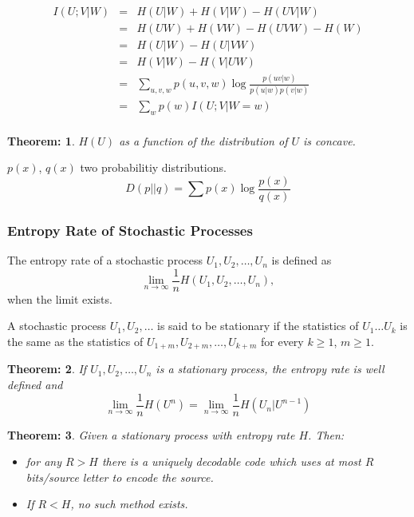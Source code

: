 \documentclass[11pt, a4paper]{scrartcl}
\newtheorem{theorem}{Theorem:}[section]
\newenvironment{definition}[1][Definition]{\begin{trivlist}
\item[\hskip \labelsep {\bfseries #1}]}{\end{trivlist}}
\begin{document}
\begin{definition}
  \begin{eqnarray*}
     I(U;V|W) &=& H(U|W)+H(V|W)-H(UV|W)\\
     &=& H(UW)+H(VW)-H(UVW)-H(W)\\
     &=& H(U|W)-H(U|VW)\\
     &=& H(V|W)-H(V|UW)\\
     &=& \sum_{u,v,w} p(u,v,w)\log \frac{p(uv|w)}{p(u|w)p(v|w)}\\
     &=& \sum_w p(w)I(U;V|W=w)\\
  \end{eqnarray*} 
\end{definition}


\begin{theorem}
  $H(U)$ as a function of the distribution of $U$ is concave.
\end{theorem}


\begin{definition} [Kullback-Leibler Divergence]
$p(x)$, $q(x)$ two probabilitiy distributions.
$$D(p||q)=\sum p(x)\log \frac{p(x)}{q(x)}$$
  
\end{definition}

\subsubsection{Entropy Rate of Stochastic Processes}

\begin{definition}
The entropy rate of a stochastic process $U_1, U_2, \dots, U_n$ is defined
as $$\lim_{n\rightarrow\infty}\frac{1}{n}H(U_1, U_2, \dots, U_n),$$ when the
limit exists.
\end{definition}


\begin{definition}[stationary stochastic process] A stochastic process $U_1,U_2,
  \dots$ is said to be stationary if the statistics of $U_1 \dots U_k$
  is the same as the statistics of $U_{1+m},U_{2+m}, \dots, U_{k+m}$
  for every $k\geq 1$, $m\geq 1$.
\end{definition}


\begin{theorem}
  If $U_1, U_2, \dots, U_n$ is a stationary process, the entropy rate
  is well defined and
$$\lim_{n\rightarrow\infty}\frac{1}{n}H(U^n) =
\lim_{n\rightarrow\infty}\frac{1}{n}H(U_n| U^{n-1})$$
\end{theorem}


\begin{theorem}
Given a stationary process with entropy rate $H$. Then: 
\begin{itemize}
\item for any $R>H$ there is a uniquely decodable code which uses at most $R$ bits/source
letter to encode the source.
\item If $R<H$, no such method exists.
\end{itemize}
\end{theorem}
\end{document}
